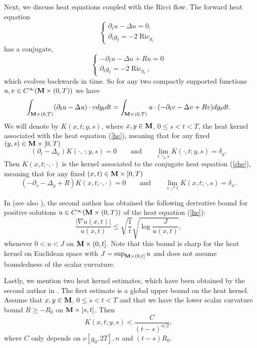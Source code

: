 \documentclass[11pt]{amsart}
\numberwithin{equation}{section}
\def\M{{\bf M}}
\def\p{\partial}
\DeclareMathOperator{\Ric}{Ric}
\numberwithin{equation}{section}
\begin{document}
Next, we discuss heat equations coupled with the Ricci flow.
The forward heat equation
\begin{equation} \label{he}
\begin{cases}
\partial_t u - \Delta u = 0,\\
\p_t g_t = - 2 \Ric_{g_t}
\end{cases}
\end{equation}
has a conjugate,
\begin{equation} \label{che}
\begin{cases}
- \partial_t u - \Delta u + R u =0 \\
\p_t g_t = - 2 \Ric_{g_t},
\end{cases}
\end{equation}
which evolves backwards in time.
So for any two compactly supported functions $u, v \in C^\infty (\M \times (0,T))$ we have
\[ \int_{\M \times (0,T)} (\partial_t u - \Delta u) \cdot v dg_t dt = \int_{\M \times (0,T)} u \cdot (- \partial_t v - \Delta v + Rv ) dg_t dt. \]
We will denote by $K (x, t; y, s)$, where $x, y \in \M$, $0\leq s < t < T$, the heat kernel associated with the heat equation (\ref{he}), meaning that for any fixed $(y,s) \in \M \times [0,T)$
\begin{equation} \label{eq:hkdefinitionsec2}
 (\partial_t - \Delta_x ) K(\cdot, \cdot ; y, s) = 0 \qquad \text{and} \qquad \lim_{t \searrow s} K(\cdot, t; y,s) = \delta_y.
\end{equation}
Then $K(x,t; \cdot, \cdot)$ is the kernel associated to the conjugate heat equation (\ref{che}), meaning that for any fixed $(x,t) \in \M \times [0,T)$
\[ (-\partial_s - \Delta_y + R ) K(x, t ; \cdot, \cdot) = 0 \qquad \text{and} \qquad \lim_{s \nearrow t} K(x,t ; \cdot, s) = \delta_x. \]

In \cite[Theorem 3.2]{Z06:1} (see also \cite[Theorem 5.1]{CH:1}), the second author has obtained the following derivative bound for positive solutions $u \in C^\infty (\M \times (0,T))$ of the heat equation (\ref{he}):
\begin{equation} \label{eq:Prel-derbound}
 \frac{|\nabla u(x,t)|}{u(x,t)}  \leq \sqrt{\frac1t} \sqrt{\log \frac{J}{u(x,t)}},
\end{equation}
whenever $0 < u < J$ on $\M \times (0, t]$.
Note that this bound is sharp for the heat kernel on Euclidean space with $J = \sup_{\M \times (0,t]} u$ and does not assume boundedness of the scalar curvature.

Lastly, we mention two heat kernel estimates, which have been obtained by the second author in \cite[equations (1.5), (1.7), etc.]{Z11:1}.
The first estimate is a global upper bound on the heat kernel.
Assume that $x, y \in \M$, $0 \leq s < t < T$ and that we have the lower scalar curvature bound $R \geq - R_0$ on $\M \times [s,t]$.
Then
\begin{equation} \label{eq:Prel-upperhkbound}
 K (x,t; y,s) < \frac{C}{(t-s)^{n/2}},
\end{equation}
where $C$ only depends on $\nu[g_0, 2T], n$ and $(t-s) R_0$.
\end{document}
